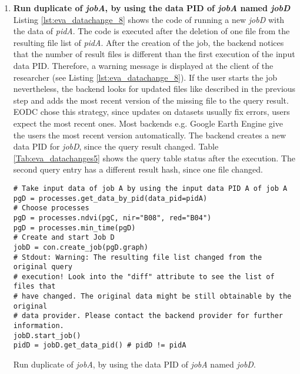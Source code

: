 \documentclass[draft,final]{vutinfth} %
\newenvironment{code}{\captionsetup{type=listing}}{}
\newcommand{\bgoesswein}[1]{{\color{blue}#1}}
\begin{document}
\begin{enumerate}
	\item \textbf{Run duplicate of \textit{jobA}, by using the data PID of \textit{jobA} named \textit{jobD}}\\
	Listing \ref{lst:eva_datachange_8} shows the code of running a new \textit{jobD} with the data of \textit{pidA}. The code is executed after the deletion of one file from the resulting file list of \textit{pidA}. After the creation of the job, the backend notices that the number of result files is different than the first execution of the input data PID. Therefore, a warning message is displayed at the client of the researcher \bgoesswein{(see Listing \ref{lst:eva_datachange_8})}. If the user starts the job nevertheless, the backend looks for updated files like described in the previous step and adds the most recent version of the missing file to the query result. \bgoesswein{EODC chose this strategy, since updates on datasets usually fix errors, users expect the most recent ones. Most backends e.g. Google Earth Engine give the users the most recent version automatically.} The backend creates a new data PID for \textit{jobD}, since the query result changed. Table \ref{Tab:eva_datachanges5} shows the query table status after the execution. The second query entry has a different result hash, since one file changed. 
	\newpage
	\begin{code}
		\begin{verbatim}
# Take input data of job A by using the input data PID A of job A
pgD = processes.get_data_by_pid(data_pid=pidA)
# Choose processes
pgD = processes.ndvi(pgC, nir="B08", red="B04")
pgD = processes.min_time(pgD)
# Create and start Job D
jobD = con.create_job(pgD.graph)
# Stdout: Warning: The resulting file list changed from the original query
# execution! Look into the "diff" attribute to see the list of files that
# have changed. The original data might be still obtainable by the original 
# data provider. Please contact the backend provider for further information.
jobD.start_job()
pidD = jobD.get_data_pid() # pidD != pidA
		\end{verbatim}
		\caption{Run duplicate of \textit{jobA}, by using the data PID of \textit{jobA} named \textit{jobD}.}
		\label{lst:eva_datachange_8}
	\end{code}


\end{enumerate}
\end{document}
